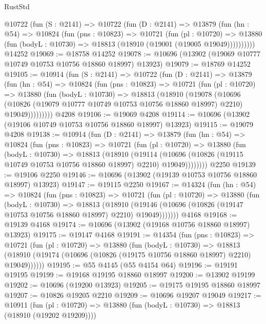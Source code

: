 \begin{lexlean}{RustStd}
\begin{coremodule}
    @10722
      (fun (S : @2141) =>
      @10722
        (fun (D : @2141) =>
        @13879
          (fun (hn : @54) =>
          @10824
            (fun (pns : @10823) =>
            @10721
              (fun (pl : @10720) =>
              @13880 (fun (bodyL : @10730) => @18813 (@18910 (@19001 (@19005 @19049))))))))))
    @14252
@19069 := @18758 @14252
@19078 := @10696 (@13902 (@19069 @10777 @10749 @10753 @10756 @18860 @18997) @13923)
@19079 := @18769 @14252
@19105 := @10914
    (fun (S : @2141) =>
    @10722
      (fun (D : @2141) =>
      @13879
        (fun (hn : @54) =>
        @10824
          (fun (pns : @10823) =>
          @10721
            (fun (pl : @10720) =>
            @13880
              (fun (bodyL : @10730) =>
              @18813
                (@18910
                  (@19078
                    (@10696
                      (@10826 (@19079 @10777 @10749 @10753 @10756 @18860 @18997) @2210)
                      @19049)))))))))
    @4208
@19106 := @19069 @4208
@19114 := @10696 (@13902 (@19106 @10749 @10753 @10756 @18860 @18997) @13923)
@19115 := @19079 @4208
@19138 := @10914
    (fun (D : @2141) =>
    @13879
      (fun (hn : @54) =>
      @10824
        (fun (pns : @10823) =>
        @10721
          (fun (pl : @10720) =>
          @13880
            (fun (bodyL : @10730) =>
            @18813
              (@18910
                (@19114
                  (@10696 (@10826 (@19115 @10749 @10753 @10756 @18860 @18997) @2210) @19049))))))))
    @2250
@19139 := @19106 @2250
@19146 := @10696 (@13902 (@19139 @10753 @10756 @18860 @18997) @13923)
@19147 := @19115 @2250
@19167 := @14324
    (fun (hn : @54) =>
    @10824
      (fun (pns : @10823) =>
      @10721
        (fun (pl : @10720) =>
        @13880
          (fun (bodyL : @10730) =>
          @18813
            (@18910
              (@19146 (@10696 (@10826 (@19147 @10753 @10756 @18860 @18997) @2210) @19049)))))))
    @4168
@19168 := @19139 @4168
@19174 := @10696 (@13902 (@19168 @10756 @18860 @18997) @13923)
@19175 := @19147 @4168
@19191 := @14354
    (fun (pns : @10823) =>
    @10721
      (fun (pl : @10720) =>
      @13880
        (fun (bodyL : @10730) =>
        @18813 (@18910 (@19174 (@10696 (@10826 (@19175 @10756 @18860 @18997) @2210) @19049))))))
@19195 := @55 @4145 (@55 @4154 @64)
@19196 := @19191 @19195
@19199 := @19168 @19195 @18860 @18997
@19200 := @13902 @19199
@19202 := @10696 (@19200 @13923)
@19205 := @19175 @19195 @18860 @18997
@19207 := @10826 @19205 @2210
@19209 := @10696 @19207 @19049
@19217 := @10911
    (fun (pl : @10720) => @13880 (fun (bodyL : @10730) => @18813 (@18910 (@19202 @19209))))

\end{coremodule}
\end{lexlean}
